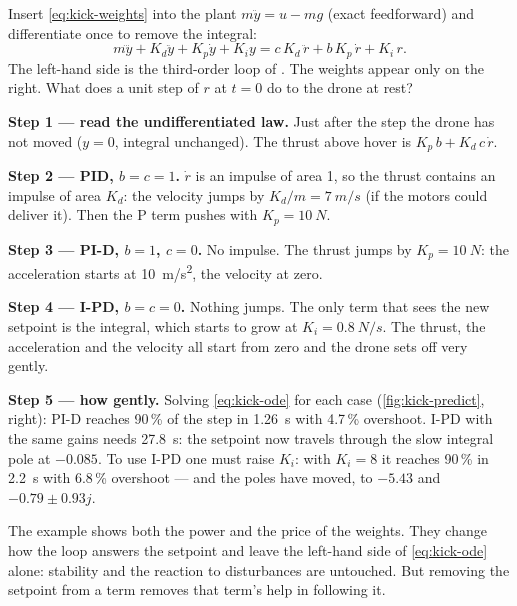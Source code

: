 \begin{example}
\label{ex:kick-weights}
Insert \cref{eq:kick-weights} into the plant $m\ddot y = u - mg$ (exact feedforward) and differentiate once to remove the integral:
\begin{equation}\label{eq:kick-ode}
  m\dddot y + K_d\ddot y + K_p\dot y + K_i y = c\,K_d\,\ddot r + b\,K_p\,\dot r + K_i\,r .
\end{equation}
The left-hand side is the third-order loop of . The weights appear only on the right. What does a unit step of $r$ at $t = 0$ do to the drone at rest?

\textbf{Step 1 — read the undifferentiated law.} Just after the step the drone has not moved ($y = 0$, integral unchanged). The thrust above hover is $K_p\,b + K_d\,c\,\dot r$.

\textbf{Step 2 — PID, $b = c = 1$.} $\dot r$ is an impulse of area 1, so the thrust contains an impulse of area $K_d$: the velocity jumps by $K_d/m = \SI{7}{m/s}$ (if the motors could deliver it). Then the P term pushes with $K_p = \SI{10}{N}$.

\textbf{Step 3 — PI-D, $b = 1$, $c = 0$.} No impulse. The thrust jumps by $K_p = \SI{10}{N}$: the acceleration starts at \SI{10}{m/s^2}, the velocity at zero.

\textbf{Step 4 — I-PD, $b = c = 0$.} Nothing jumps. The only term that sees the new setpoint is the integral, which starts to grow at $K_i = \SI{0.8}{N/s}$. The thrust, the acceleration and the velocity all start from zero and the drone sets off very gently.

\textbf{Step 5 — how gently.} Solving \cref{eq:kick-ode} for each case (\cref{fig:kick-predict}, right): PI-D reaches 90\,\% of the step in \SI{1.26}{s} with 4.7\,\% overshoot. I-PD with the same gains needs \SI{27.8}{s}: the setpoint now travels through the slow integral pole at $-0.085$. To use I-PD one must raise $K_i$: with $K_i = 8$ it reaches 90\,\% in \SI{2.2}{s} with 6.8\,\% overshoot — and the poles have moved, to $-5.43$ and $-0.79 \pm 0.93j$.
\end{example}

The example shows both the power and the price of the weights. They change how the loop answers the setpoint and leave the left-hand side of \cref{eq:kick-ode} alone: stability and the reaction to disturbances are untouched. But removing the setpoint from a term removes that term's help in following it.


